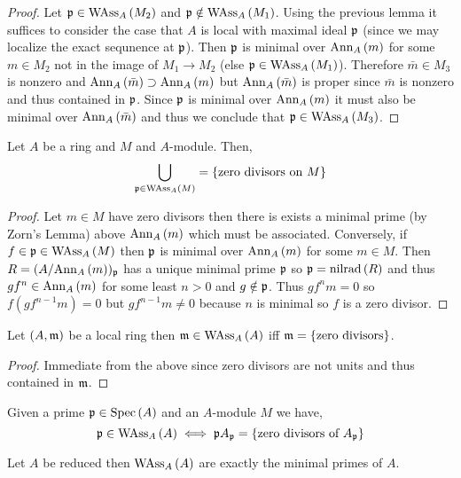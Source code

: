 \documentclass[12pt]{article}
\begin{document}
\begin{proof}
Let $\mathfrak{p} \in \mathrm{WAss}_{A}\left(M_2 \right)$ and $\mathfrak{p} \notin \mathrm{WAss}_{A}\left(M_1 \right)$. Using the previous lemma it suffices to consider the case that $A$ is local with maximal ideal $\mathfrak{p}$ (since we may localize the exact sequnence at $\mathfrak{p}$). 
Then $\mathfrak{p}$ is minimal over $\mathrm{Ann}_{A}\left(m\right)$ for some $m \in M_2$ not in the image of $M_1 \to M_2$ (else $\mathfrak{p} \in \mathrm{WAss}_{A}\left(M_1 \right)$). Therefore $\bar{m} \in M_3$ is nonzero and $\mathrm{Ann}_{A}\left(\bar{m}\right) \supset \mathrm{Ann}_{A}\left(m\right)$ but $\mathrm{Ann}_{A}\left(\bar{m}\right)$ is proper since $\bar{m}$ is nonzero and thus contained in $\mathfrak{p}$. Since $\mathfrak{p}$ is minimal over $\mathrm{Ann}_{A}\left(m\right)$ it must also be minimal over $\mathrm{Ann}_{A}\left(\bar{m}\right)$ and thus we conclude that $\mathfrak{p} \in \mathrm{WAss}_{A}\left(M_3 \right)$.
\end{proof}

\begin{lemma}
Let $A$ be a ring and $M$ and $A$-module. Then,
\[ \bigcup_{\mathfrak{p} \in \mathrm{WAss}_{A}\left(M \right)} = \{ \text{zero divisors on } M \} \]
\end{lemma}

\begin{proof}
Let $m \in M$ have zero divisors then there is exists a minimal prime (by Zorn's Lemma) above $\mathrm{Ann}_{A}\left(m\right)$ which must be associated. Conversely, if $f \in \mathfrak{p} \in \mathrm{WAss}_{A}\left(M \right)$ then $\mathfrak{p}$ is minimal over $\mathrm{Ann}_{A}\left(m\right)$ for some $m \in M$. Then $R = (A / \mathrm{Ann}_{A}\left(m\right))_{\mathfrak{p}}$ has a unique minimal prime $\mathfrak{p}$ so $\mathfrak{p} = \mathrm{nilrad}\left( R \right)$ and thus $g f^n \in \mathrm{Ann}_{A}\left(m\right)$ for some least $n > 0$ and $g \notin \mathfrak{p}$. Thus $g f^n m = 0$ so $f (g f^{n-1} m) = 0$ but $g f^{n-1} m \neq 0$ because $n$ is minimal so $f$ is a zero divisor.
\end{proof}

\begin{prop}
Let $(A, \mathfrak{m})$ be a local ring then $\mathfrak{m} \in \mathrm{WAss}_{A}\left(A \right)$ iff $\mathfrak{m} = \{ \text{zero divisors} \}$.
\end{prop}

\begin{proof}
Immediate from the above since zero divisors are not units and thus contained in $\mathfrak{m}$.
\end{proof}

\begin{cor}
Given a prime $\mathfrak{p} \in \mathrm{Spec}\left( A \right)$ and an $A$-module $M$ we have,
\[ \mathfrak{p} \in \mathrm{WAss}_{A}\left(A \right) \iff \mathfrak{p} A_{\mathfrak{p}} = \{ \text{zero divisors of } A_{\mathfrak{p}} \} \]
\end{cor}

\begin{prop}
Let $A$ be reduced then $\mathrm{WAss}_{A}\left(A \right)$ are exactly the minimal primes of $A$.
\end{prop}
\end{document}
